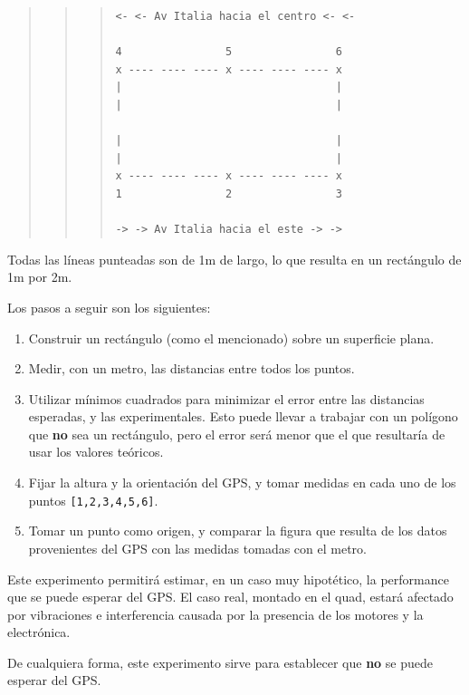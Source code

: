 \documentclass[spanish,12pt,a4paper,titlepage]{report}
\begin{document}
\begin{quote}
\begin{quote}
\begin{quote}
\begin{verbatim}
<- <- Av Italia hacia el centro <- <-

4                5                6
x ---- ---- ---- x ---- ---- ---- x
|                                 |
|                                 |

|                                 |
|                                 |
x ---- ---- ---- x ---- ---- ---- x
1                2                3

-> -> Av Italia hacia el este -> ->
\end{verbatim}
\end{quote}
\end{quote}
\end{quote}

Todas las líneas punteadas son de 1m de largo, lo que resulta en un rectángulo de 1m por 2m.

Los pasos a seguir son los siguientes:

\begin{enumerate}
\item Construir un rectángulo (como el mencionado) sobre un superficie plana.
\item Medir, con un metro, las distancias entre todos los puntos.
\item Utilizar mínimos cuadrados para minimizar el error entre las distancias esperadas, y las experimentales. Esto puede llevar a trabajar con un polígono que \textbf{no} sea un rectángulo, pero el error será menor que el que resultaría de usar los valores teóricos.
\item Fijar la altura y la orientación del GPS, y tomar medidas en cada uno de los puntos \verb+[1,2,3,4,5,6]+.
\item Tomar un punto como origen, y comparar la figura que resulta de los datos provenientes del GPS con las medidas tomadas con el metro.
\end{enumerate}

Este experimento permitirá estimar, en un caso muy hipotético, la performance que se puede esperar del GPS. El caso real, montado en el quad, estará afectado por vibraciones e interferencia causada por la presencia de los motores y la electrónica.

De cualquiera forma, este experimento sirve para establecer que \textbf{no} se puede esperar del GPS.
\end{document}
